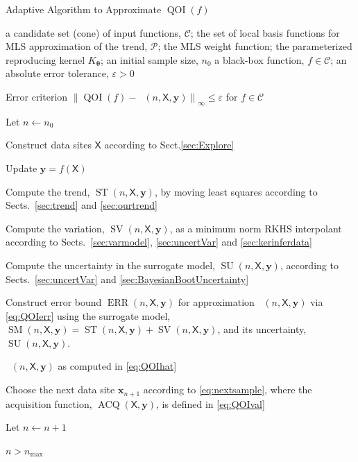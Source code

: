 \documentclass[11pt]{NSFamsart}
\DeclareMathOperator{\QOI}{QOI} %
\DeclareMathOperator{\APP}{\widehat{\QOI}}
\DeclareMathOperator{\SURR}{SM} %
\DeclareMathOperator{\STREND}{ST} %
\DeclareMathOperator{\SVAR}{SV} %
\DeclareMathOperator{\ERR}{ERR}
\DeclareMathOperator{\VAL}{ACQ}
\DeclareMathOperator{\SURRERR}{SU}
\newcommand{\mX}{\mathsf{X}}
\newcommand{\bx}{{\boldsymbol{x}}}
\newcommand{\by}{{\boldsymbol{y}}}
\newcommand{\btheta}{{\boldsymbol{\theta}}}
\newcommand{\cc}{\mathcal{C}}
\newcommand{\cP}{\mathcal{P}}
\newcommand{\bignorm}[2][{}]{\ensuremath{\bigl \lVert #2 \bigr \rVert}_{#1}}
\begin{document}
\begin{algorithm}[H]
	\caption*{Adaptive Algorithm to Approximate $\QOI(f)$ \label{alg:algframe}}
	\begin{algorithmic}
		\PARAM a candidate set (cone) of input functions, $\cc$; the set of local basis functions for MLS approximation of the trend, $\cP$; the MLS weight function; the parameterized reproducing kernel  $K_{\btheta}$; an initial sample size, $n_0$
		\INPUT a black-box function, $f \in \cc$; an absolute error tolerance, $\varepsilon>0$
		
		\Ensure Error criterion $\bignorm[\infty]{\QOI(f) - \APP(n,\mX,\by)} \le \varepsilon$  for $f \in \cc$
		
		\State Let $n \leftarrow n_0$
		
		\State Construct data sites $\mX$ according to Sect.\ref{sec:Explore}  
		
		\Repeat {}
		
		\State Update $\by = f(\mX)$
		
		\State Compute the  trend, $\STREND(n,\mX,\by)$, by moving least squares according to Sects.\ \ref{sec:trend} and \ref{sec:ourtrend}
		
		\State Compute the variation, $\SVAR(n,\mX,\by)$, as a minimum norm RKHS interpolant according to Sects.\ \ref{sec:varmodel}, \ref{sec:uncertVar} and \ref{sec:kerinferdata}
		
		\State Compute the  uncertainty in the surrogate model, $\SURRERR(n,\mX,\by)$, according to Sects.\ \ref{sec:uncertVar} and \ref{sec:BayesianBootUncertainty}
		
		\State Construct error bound $\ERR(n,\mX,\by)$ for approximation $\APP(n,\mX,\by)$ via \eqref{eq:QOIerr} using the surrogate model, $\SURR(n,\mX,\by) = \STREND(n,\mX,\by) + \SVAR(n,\mX,\by)$, and its uncertainty, $\SURRERR(n,\mX,\by)$.
		
		\If{$\ERR(n,\mX,\by) \le \varepsilon$}
		
		\RETURN $\APP(n,\mX,\by)$ as computed in \eqref{eq:QOIhat}
		
		\EndIf
				
		\State Choose the next data site $\bx_{n+1}$ according to \eqref{eq:nextsample}, where the acquisition function, $\VAL(\mX,\by)$, is defined in \eqref{eq:QOIval}
		
		\State Let $n \leftarrow n + 1$

		\Until $n > n_{\max}$
				
	\end{algorithmic}
\end{algorithm}
\end{document}
